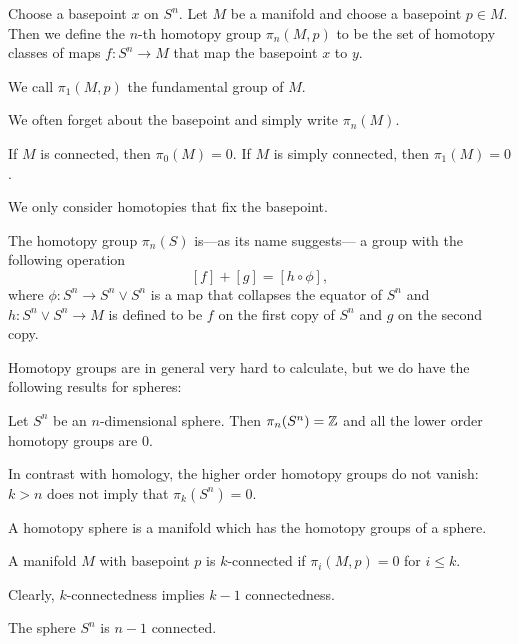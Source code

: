 \begin{definition}
    Choose a basepoint $x$ on $S^{n}$.
    Let $M$ be a manifold and choose a basepoint $p \in M$.
    Then we define the $n$-th homotopy group $\pi_n(M, p)$ to be the set of homotopy classes of maps  $f: S^{n} \to  M$ that map the basepoint $x$ to $y$.
\end{definition}
\begin{remark}
    We call $\pi_1(M, p)$ the fundamental group of $M$.
\end{remark}
\begin{remark}
    We often forget about the basepoint and simply write $\pi_n(M)$.
\end{remark}
\begin{eg}
    If $M$ is connected, then  $\pi_0(M) = 0$.
    If  $M$ is simply connected, then  $\pi_1(M) = 0$.
\end{eg}
\begin{remark}
    We only consider homotopies that fix the basepoint.
\end{remark}
\begin{prop}
    The homotopy group $\pi_n(S)$ is---as its name suggests--- a group with the following operation
    \[
        [f] + [g] = [h  \circ  \phi]
    ,\] 
    where $\phi : S^{n} \to  S^{n} \vee S^{n}$ is a map that collapses the equator of $S^{n}$ and $h : S^{n} \vee S^{n} \to  M$ is defined to be $f$ on the first copy of  $S^{n}$ and $g$ on the second copy.
\end{prop}


Homotopy groups are in general very hard to calculate, but we do have the following results for spheres:
\begin{prop}
    Let $S^{n}$ be an $n$-dimensional sphere.
    Then $\pi_n(S^{n}) = \mathbb{Z}$ and all the lower order homotopy groups are $0$.
\end{prop}
\begin{remark}
    In contrast with homology,
    the higher order homotopy groups do not vanish:
    $k > n$ does not imply that $\pi_k(S^{n}) = 0$.
\end{remark}

\begin{definition}
    A homotopy sphere is a manifold which has the homotopy groups of a sphere.
\end{definition}

\begin{definition}[$k$-connected]
    A manifold $M$ with basepoint $p$ is $k$-connected if  $\pi_i(M, p) = 0$ for  $i \le  k$.
\end{definition}
\begin{remark}
    Clearly, $k$-connectedness implies  $k-1$ connectedness.
\end{remark}
\begin{eg}
    The sphere $S^{n}$ is $n-1$ connected.
\end{eg}

